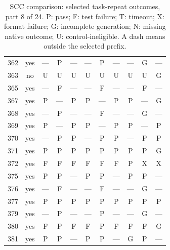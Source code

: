\begin{table}[p]
\begin{tabular*}{\textwidth}{@{\extracolsep{\fill}}rc*{9}{c}@{}}
362 & yes & — & P & — & — & P & — & — & G & —\\
363 & no & U & U & U & U & U & U & U & U & G\\
365 & yes & — & F & — & — & F & — & — & F & —\\
367 & yes & P & — & P & P & — & P & P & — & G\\
368 & yes & — & P & — & — & F & — & — & G & —\\
369 & yes & P & — & P & P & — & P & P & — & P\\
370 & yes & — & P & P & — & P & P & — & P & P\\
371 & yes & P & P & P & P & P & P & P & P & G\\
372 & yes & F & F & F & F & F & F & P & X & X\\
375 & yes & P & P & — & P & P & — & P & P & —\\
376 & yes & — & F & — & — & F & — & — & G & —\\
377 & yes & P & P & P & P & P & P & P & P & P\\
379 & yes & — & P & — & — & P & — & — & G & —\\
380 & yes & F & P & F & F & P & F & F & F & G\\
381 & yes & P & P & — & P & P & — & G & P & —\\
\bottomrule\end{tabular*}
\caption{SCC comparison: selected task-repeat outcomes, part 8 of 24. P: pass; F: test failure; T: timeout; X: format failure; G: incomplete generation; N: missing native outcome; U: control-ineligible. A dash means outside the selected prefix.}
\end{table}
\clearpage
